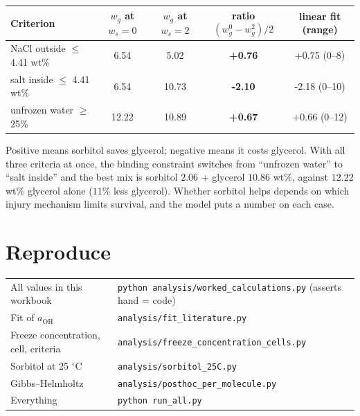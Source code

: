 \documentclass[11pt,a4paper]{article}
\newcommand{\aoh}{a_{\mathrm{OH}}}
\newcommand{\file}[1]{\texttt{\small #1}}
\begin{document}
\begin{center}\small
\begin{tabular}{l c c c c}
\toprule
Criterion & $w_g$ at $w_s=0$ & $w_g$ at $w_s=2$ & ratio $(w_g^0-w_g^2)/2$ & linear fit (range)\\
\midrule
NaCl outside $\le$ 4.41 wt\% & 6.54 & 5.02 & \textbf{+0.76} & +0.75 (0--8)\\
salt inside $\le$ 4.41 wt\% & 6.54 & 10.73 & \textbf{-2.10} & -2.18 (0--10)\\
unfrozen water $\ge$ 25\% & 12.22 & 10.89 & \textbf{+0.67} & +0.66 (0--12)\\
\bottomrule
\end{tabular}
\end{center}
\begin{result}
Positive means sorbitol saves glycerol; negative means it costs glycerol. With all three criteria at once, the binding constraint switches
from ``unfrozen water'' to ``salt inside'' and the best mix is sorbitol $2.06$ + glycerol $10.86$ wt\%, against
$12.22$ wt\% glycerol alone ($11$\% less glycerol). Whether sorbitol helps depends on which injury mechanism
limits survival, and the model puts a number on each case.
\end{result}

\section*{Reproduce}
\small
\begin{tabular}{@{}l l@{}}
All values in this workbook & \file{python analysis/worked\_calculations.py} (asserts hand = code)\\
Fit of $\aoh$ & \file{analysis/fit\_literature.py}\\
Freeze concentration, cell, criteria & \file{analysis/freeze\_concentration\_cells.py}\\
Sorbitol at 25 $^\circ$C & \file{analysis/sorbitol\_25C.py}\\
Gibbs--Helmholtz & \file{analysis/posthoc\_per\_molecule.py}\\
Everything & \file{python run\_all.py}\\
\end{tabular}
\end{document}
